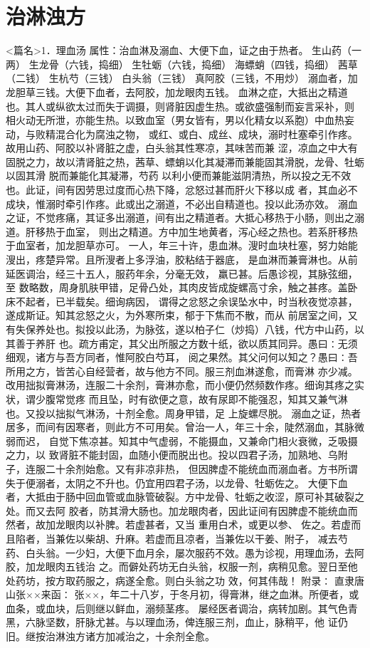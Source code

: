\documentclass[a4paper,12pt,UTF8,twoside]{ctexbook}
\begin{document}
\chapter{治淋浊方}
<篇名>1．理血汤
属性：治血淋及溺血、大便下血，证之由于热者。 
生山药（一两） 生龙骨（六钱，捣细） 生牡蛎（六钱，捣细） 海螵蛸（四钱，捣细） 茜草（二钱） 
生杭芍（三钱） 白头翁（三钱） 真阿胶（三钱，不用炒） 
溺血者，加龙胆草三钱。大便下血者，去阿胶，加龙眼肉五钱。 
血淋之症，大抵出之精道也。其人或纵欲太过而失于调摄，则肾脏因虚生热。或欲盛强制而妄言采补，则 
相火动无所泄，亦能生热。以致血室（男女皆有，男以化精女以系胞）中血热妄动，与败精混合化为腐浊之物， 
或红、或白、成丝、成块，溺时杜塞牵引作疼。故用山药、阿胶以补肾脏之虚，白头翁其性寒凉，其味苦而兼 
涩，凉血之中大有固脱之力，故以清肾脏之热，茜草、螵蛸以化其凝滞而兼能固其滑脱，龙骨、牡蛎以固其滑 
脱而兼能化其凝滞，芍药 
以利小便而兼能滋阴清热，所以投之无不效也。此证，间有因劳思过度而心热下降，忿怒过甚而肝火下移以成 
者，其血必不成块，惟溺时牵引作疼。此或出之溺道，不必出自精道也。投以此汤亦效。 
溺血之证，不觉疼痛，其证多出溺道，间有出之精道者。大抵心移热于小肠，则出之溺道。肝移热于血室， 
则出之精道。方中加生地黄者，泻心经之热也。若系肝移热于血室者，加龙胆草亦可。 
一人，年三十许，患血淋。溲时血块杜塞，努力始能溲出，疼楚异常。且所溲者上多浮油，胶粘结于器底， 
是血淋而兼膏淋也。从前延医调治，经三十五人，服药年余，分毫无效， 羸已甚。后愚诊视，其脉弦细，至 
数略数，周身肌肤甲错，足骨凸处，其肉皮皆成旋螺高寸余，触之甚疼。盖卧床不起者，已半载矣。细询病因， 
谓得之忿怒之余误坠水中，时当秋夜觉凉甚，遂成斯证。知其忿怒之火，为外寒所束，郁于下焦而不散，而从 
前居室之间，又有失保养处也。拟投以此汤，为脉弦，遂以柏子仁（炒捣）八钱，代方中山药，以其善于养肝 
也。疏方甫定，其父出所服之方数十纸，欲以质其同异。愚曰∶无须细观，诸方与吾方同者，惟阿胶白芍耳， 
阅之果然。其父问何以知之？愚曰∶吾所用之方，皆苦心自经营者，故与他方不同。服三剂血淋遂愈，而膏淋 
亦少减。改用拙拟膏淋汤，连服二十余剂，膏淋亦愈，而小便仍然频数作疼。细询其疼之实状，谓少腹常觉疼 
而且坠，时有欲便之意，故有尿即不能强忍，知其又兼气淋也。又投以拙拟气淋汤，十剂全愈。周身甲错，足 
上旋螺尽脱。 
溺血之证，热者居多，而间有因寒者，则此方不可用矣。曾治一人，年三十余，陡然溺血，其脉微弱而迟， 
自觉下焦凉甚。知其中气虚弱，不能摄血，又兼命门相火衰微，乏吸摄之力，以 
致肾脏不能封固，血随小便而脱出也。投以四君子汤，加熟地、乌附子，连服二十余剂始愈。又有非凉非热， 
但因脾虚不能统血而溺血者。方书所谓失于便溺者，太阴之不升也。仍宜用四君子汤，以龙骨、牡蛎佐之。 
大便下血者，大抵由于肠中回血管或血脉管破裂。方中龙骨、牡蛎之收涩，原可补其破裂之处。而又去阿 
胶者，防其滑大肠也。加龙眼肉者，因此证间有因脾虚不能统血而然者，故加龙眼肉以补脾。若虚甚者，又当 
重用白术，或更以参、 佐之。若虚而且陷者，当兼佐以柴胡、升麻。若虚而且凉者，当兼佐以干姜、附子， 
减去芍药、白头翁。一少妇，大便下血月余，屡次服药不效。愚为诊视，用理血汤，去阿胶，加龙眼肉五钱治 
之。而僻处药坊无白头翁，权服一剂，病稍见愈。翌日至他处药坊，按方取药服之，病遂全愈。则白头翁之功 
效，何其伟哉！ 
附录∶ 
直隶唐山张××来函∶ 
张××，年二十八岁，于冬月初，得膏淋，继之血淋。所便者，或血条，或血块，后则继以鲜血，溺频茎疼。 
屡经医者调治，病转加剧。其气色青黑，六脉坚数，肝脉尤甚。与以理血汤，俾连服三剂，血止，脉稍平，他 
证仍旧。继按治淋浊方诸方加减治之，十余剂全愈。 
\end{document}
